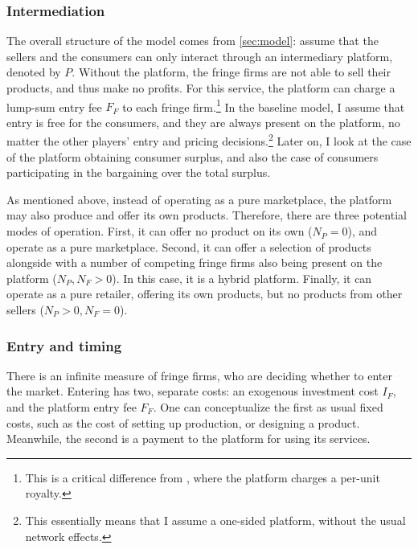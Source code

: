 \documentclass[a4paper]{article}
\begin{document}
\subsubsection{Intermediation}

The overall structure of the model comes from \cref{sec:model}: assume that the sellers and the consumers can only interact through an intermediary platform, denoted by $P$.
Without the platform, the fringe firms are not able to sell their products, and thus make no profits.
For this service, the platform can charge a lump-sum entry fee $F_F$ to each fringe firm.\footnote{
    This is a critical difference from \textcite[]{anderson2021hybrid}, where the platform charges a per-unit royalty.
}
In the baseline model, I assume that entry is free for the consumers, and they are always present on the platform, no matter the other players' entry and pricing decisions.\footnote{
    This essentially means that I assume a one-sided platform, without the usual network effects.
}
Later on, I look at the case of the platform obtaining consumer surplus, and also the case of consumers participating in the bargaining over the total surplus.

As mentioned above, instead of operating as a pure marketplace, the platform may also produce and offer its own products.
Therefore, there are three potential modes of operation.
First, it can offer no product on its own ($N_P = 0$), and operate as a pure marketplace.
Second, it can offer a selection of products alongside with a number of competing fringe firms also being present on the platform ($N_P, N_F > 0$).
In this case, it is a hybrid platform.
Finally, it can operate as a pure retailer, offering its own products, but no products from other sellers ($N_P > 0, N_F = 0$).

\subsubsection{Entry and timing}

There is an infinite measure of fringe firms, who are deciding whether to enter the market.
Entering has two, separate costs: an exogenous investment cost $I_F$, and the platform entry fee $F_F$.
One can conceptualize the first as usual fixed costs, such as the cost of setting up production, or designing a product.
Meanwhile, the second is a payment to the platform for using its services.
\end{document}
